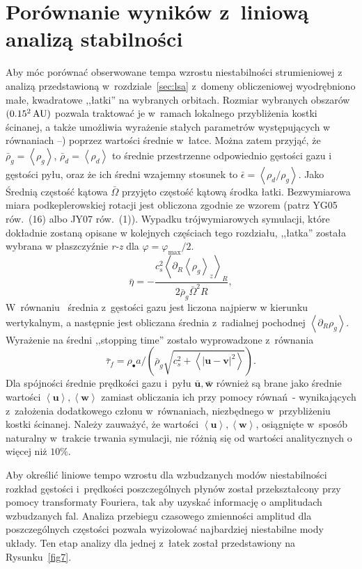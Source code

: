 \section{Porównanie wyników z~liniową analizą stabilności}
\label{sec:simulation_analysis}
Aby móc porównać obserwowane tempa wzrostu niestabilności strumieniowej z
analizą przedstawioną w~rozdziale~\ref{sec:lsa} z~domeny obliczeniowej
wyodrębniono małe, kwadratowe ,,łatki'' na wybranych orbitach. Rozmiar wybranych
obszarów $(0.15^2\hbox{$\thinspace\textrm{AU}$})$ pozwala traktować je w~ramach lokalnego przybliżenia
kostki ścinanej, a także umożliwia wyrażenie stałych parametrów występujących w
równaniach --) poprzez wartości średnie w~łatce.
Można zatem przyjąć, że $\bar{\rho}_g = \left<\rho_g\right>$, $\bar{\rho}_d =
\left<\rho_d\right>$ to średnie przestrzenne odpowiednio gęstości gazu i
gęstości pyłu, oraz że ich średni wzajemny stosunek to $\bar{\epsilon} =
\left<\rho_d / \rho_g\right>$. Jako Średnią częstość kątowa $\bar{\Omega}$
przyjęto częstość kątową środka łatki. Bezwymiarowa miara podkeplerowskiej
rotacji jest obliczona zgodnie ze wzorem (patrz YG05 rów.~(16) albo JY07
rów.~(1)).  Wypadku trójwymiarowych symulacji, które dokładnie zostaną opisane
w kolejnych częściach tego rozdziału, ,,łatka'' została wybrana w
płaszczyźnie {\it r-z} dla $\varphi = \varphi_\textrm{max} / 2$.
%
\begin{equation}
   \bar{\eta} = -\frac{c_s^2\left<\partial_R \left<\rho_g\right>_z\right>_R}
      {2\bar{\rho}_g\bar{\Omega}^2 R},
   \label{eq:meaneta}
\end{equation}
%
W~równaniu~ średnia z~gęstości gazu jest liczona najpierw w
kierunku wertykalnym, a następnie jest obliczana średnia z~radialnej pochodnej 
$\left<\partial_R \rho_g\right>$. Wyrażenie na średni ,,stopping time'' zostało
wyprowadzone z~równania~
\begin{equation}
   \bar{\tau}_f = \rho_\bullet a / \left(\bar{\rho}_g \sqrt{c_s^2 +
   \left<\left|\mathbf{u} - \mathbf{v}\right|^2\right>} \right).
\end{equation}
%
Dla spójności średnie prędkości gazu i~pyłu $\bar{\mathbf{u}},
\bar{\mathbf{w}}$ również są brane jako średnie wartości
$\left<\mathbf{u}\right>, \left<\mathbf{w}\right>$ zamiast obliczania ich przy
pomocy równań~- wynikających z~założenia dodatkowego
członu w~równaniach, niezbędnego w~przybliżeniu kostki ścinanej. 
Należy zauważyć, że wartości $\left<\mathbf{u}\right>, \left<\mathbf{w}\right>$,
osiągnięte w~sposób naturalny w~trakcie trwania symulacji, nie różnią się od
wartości analitycznych o więcej niż $10\%$.
\par Aby określić liniowe tempo wzrostu dla wzbudzanych modów niestabilności
rozkład gęstości i~prędkości poszczególnych płynów został przekształcony przy
pomocy transformaty Fouriera, tak aby uzyskać informację o amplitudach
wzbudzanych fal. Analiza przebiegu czasowego zmienności amplitud dla
poszczególnych częstości pozwala wyizolować najbardziej niestabilne mody układy.
Ten etap analizy dla jednej z~łatek został przedstawiony na Rysunku~\ref{fig7}.

